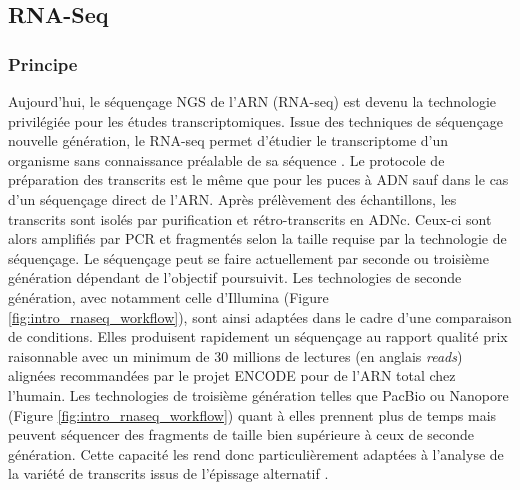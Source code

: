 


\subsection{RNA-Seq}

\subsubsection{Principe}

Aujourd'hui, le séquençage NGS de l'ARN (\acrshort{RNA-seq}) est devenu la technologie privilégiée pour les études \glspl{transcriptomique}. Issue des techniques de séquençage nouvelle génération, le \acrshort{RNA-seq} permet d'étudier le \gls{transcriptome} d'un \gls{organisme} sans connaissance préalable de sa séquence \cite{Wang2009Jan}. Le protocole de préparation des transcrits est le même que pour les puces à \acrshort{ADN} sauf dans le cas d'un séquençage direct de l'ARN. Après prélèvement des échantillons, les transcrits sont isolés par purification et rétro-transcrits en \acrshort{ADNc}. Ceux-ci sont alors amplifiés par PCR et fragmentés selon la taille requise par la technologie de séquençage. Le séquençage peut se faire actuellement par seconde ou troisième génération dépendant de l'objectif poursuivit. Les technologies de seconde génération, avec notamment celle d'Illumina (Figure \ref{fig:intro_rnaseq_workflow}), sont ainsi adaptées dans le cadre d'une comparaison de \glspl{condition}. Elles produisent rapidement un séquençage au rapport qualité prix raisonnable avec un minimum de 30 millions de lectures (en anglais \textit{reads}) alignées recommandées par le projet ENCODE \cite{ENCODE2012} pour de l'ARN total chez l'humain. Les technologies de troisième génération telles que PacBio ou Nanopore (Figure \ref{fig:intro_rnaseq_workflow}) quant à elles prennent plus de temps mais peuvent séquencer des fragments de taille bien supérieure à ceux de seconde génération. Cette capacité les rend donc particulièrement adaptées à l'analyse de la variété de transcrits issus de l'épissage alternatif \cite{Bergsma2018Jan}. 

